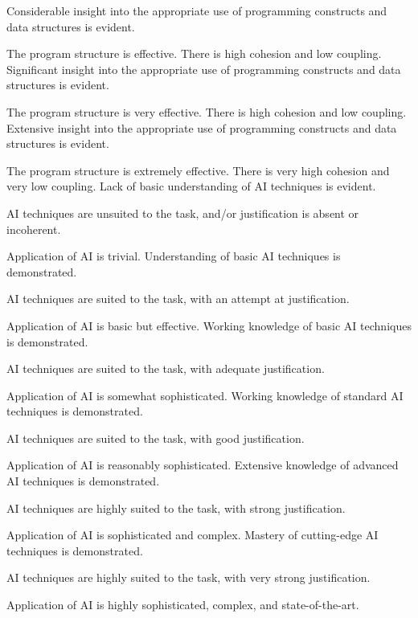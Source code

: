 \documentclass{../../fal_assignment}
\begin{document}
\begin{markingrubric}
        \grade Considerable insight into the appropriate use of programming constructs and data structures is evident.
            \par The program structure is effective. There is high cohesion and low coupling.
        \grade Significant insight into the appropriate use of programming constructs and data structures is evident.
            \par The program structure is very effective. There is high cohesion and low coupling.
        \grade Extensive insight into the appropriate use of programming constructs and data structures is evident.
            \par The program structure is extremely effective. There is very high cohesion and very low coupling.
%
        \grade\fail Lack of basic understanding of AI techniques is evident.
            \par AI techniques are unsuited to the task, and/or justification is absent or incoherent.
            \par Application of AI is trivial.
        \grade Understanding of basic AI techniques is demonstrated.
            \par AI techniques are suited to the task, with an attempt at justification.
            \par Application of AI is basic but effective.
        \grade Working knowledge of basic AI techniques is demonstrated.
            \par AI techniques are suited to the task, with adequate justification.
            \par Application of AI is somewhat sophisticated.
        \grade Working knowledge of standard AI techniques is demonstrated.
            \par AI techniques are suited to the task, with good justification.
            \par Application of AI is reasonably sophisticated.
        \grade Extensive knowledge of advanced AI techniques is demonstrated.
            \par AI techniques are highly suited to the task, with strong justification.
            \par Application of AI is sophisticated and complex.
        \grade Mastery of cutting-edge AI techniques is demonstrated.
            \par AI techniques are highly suited to the task, with very strong justification.
            \par Application of AI is highly sophisticated, complex, and state-of-the-art.
\end{markingrubric}
\end{document}

